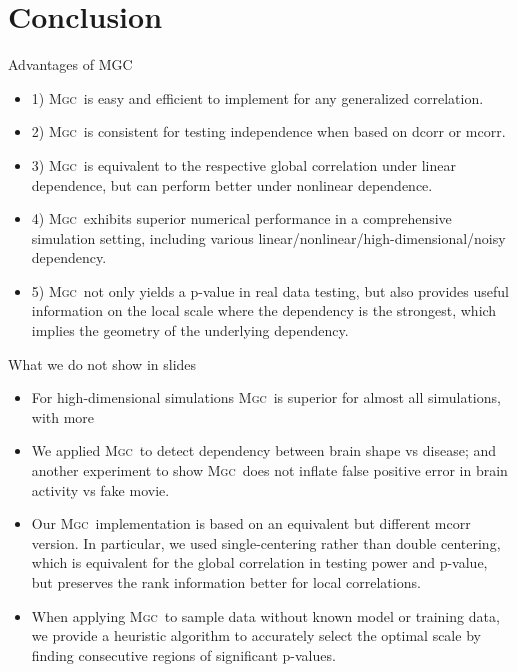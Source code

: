 \documentclass{beamer}
\providecommand{\sct}[1]{{\normalfont\textsc{#1}}}
\newcommand{\Mgc}{\sct{Mgc}}
\begin{document}
\section{Conclusion}
\begin{frame}{Advantages of MGC}
\begin{itemize}[<+->]
\item 1) \Mgc~is easy and efficient to implement for any generalized correlation.
\item 2) \Mgc~is consistent for testing independence when based on dcorr or mcorr.
\item 3) \Mgc~is equivalent to the respective global correlation under linear dependence, but can perform better under nonlinear dependence.
\item 4) \Mgc~exhibits superior numerical performance in a comprehensive simulation setting, including various linear/nonlinear/high-dimensional/noisy dependency.
\item 5) \Mgc~not only yields a p-value in real data testing, but also provides useful information on the local scale where the dependency is the strongest, which implies the geometry of the underlying dependency.
\end{itemize}
\end{frame}

\begin{frame}{What we do not show in slides}
\begin{itemize}[<+->]
\item For high-dimensional simulations \Mgc~is superior for almost all simulations, with more 
\item We applied \Mgc~to detect dependency between brain shape vs disease; and another experiment to show \Mgc~does not inflate false positive error in brain activity vs fake movie.
\item Our \Mgc~implementation is based on an equivalent but different mcorr version. In particular, we used single-centering rather than double centering, which is equivalent for the global correlation in testing power and p-value, but preserves the rank information better for local correlations.
\item When applying \Mgc~to sample data without known model or training data, we provide a heuristic algorithm to accurately select the optimal scale by finding consecutive regions of significant p-values.
\end{itemize}
\end{frame}

\end{document}
